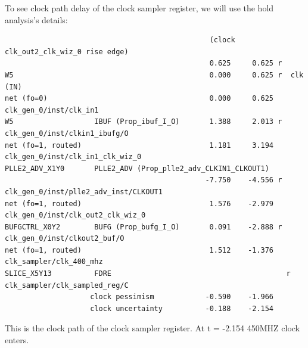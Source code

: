 \documentclass{report}
\begin{document}
To see clock path delay of the clock sampler register, we will use the hold analysis's details:

\begin{verbatim}
                                                (clock clk_out2_clk_wiz_0 rise edge)
                                                0.625     0.625 r  
W5                                              0.000     0.625 r  clk (IN)
net (fo=0)                                      0.000     0.625    clk_gen_0/inst/clk_in1
W5                   IBUF (Prop_ibuf_I_O)       1.388     2.013 r  clk_gen_0/inst/clkin1_ibufg/O
net (fo=1, routed)                              1.181     3.194    clk_gen_0/inst/clk_in1_clk_wiz_0
PLLE2_ADV_X1Y0       PLLE2_ADV (Prop_plle2_adv_CLKIN1_CLKOUT1)
                                               -7.750    -4.556 r  clk_gen_0/inst/plle2_adv_inst/CLKOUT1
net (fo=1, routed)                              1.576    -2.979    clk_gen_0/inst/clk_out2_clk_wiz_0
BUFGCTRL_X0Y2        BUFG (Prop_bufg_I_O)       0.091    -2.888 r  clk_gen_0/inst/clkout2_buf/O
net (fo=1, routed)                              1.512    -1.376    clk_sampler/clk_400_mhz
SLICE_X5Y13          FDRE                                         r  clk_sampler/clk_sampled_reg/C
                    clock pessimism            -0.590    -1.966    
                    clock uncertainty          -0.188    -2.154  
\end{verbatim}
This is the clock path of the clock sampler register. At t = -2.154 450MHZ clock enters. 
\end{document}
